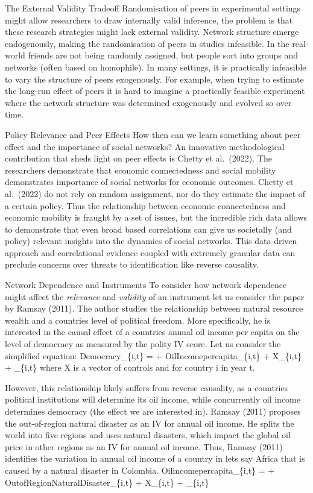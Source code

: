 \documentclass[
  a4paper,
]{article}
\begin{document}
The External Validity Tradeoff Randomisation of peers in experimental
settings might allow researchers to draw internally valid inference, the
problem is that these research strategies might lack external validity.
Network structure emerge endogenously, making the randomisation of peers
in studies infeasible. In the real-world friends are not being randomly
assigned, but people sort into groups and networks (often based on
homophile). In many settings, it is practically infeasible to vary the
structure of peers exogenously. For example, when trying to estimate the
long-run effect of peers it is hard to imagine a practically feasible
experiment where the network structure was determined exogenously and
evolved so over time.

Policy Relevance and Peer Effects How then can we learn something about
peer effect and the importance of social networks? An innovative
methodological contribution that sheds light on peer effects is Chetty
et al.~(2022). The researchers demonstrate that economic connectedness
and social mobility demonstrates importance of social networks for
economic outcomes. Chetty et al.~(2022) do not rely on random
assignment, nor do they estimate the impact of a certain policy. Thus
the relationship between economic connectedness and economic mobility is
fraught by a set of issues, but the incredible rich data allows to
demonstrate that even broad based correlations can give us societally
(and policy) relevant insights into the dynamics of social networks.
This data-driven approach and correlational evidence coupled with
extremely granular data can preclude concerns over threats to
identification like reverse causality.

Network Dependence and Instruments To consider how network dependence
might affect the \textit{relevance} and \textit{validity} of an
instrument let us consider the paper by Ramsay (2011). The author
studies the relationship between natural resource wealth and a countries
level of political freedom. More specifically, he is interested in the
causal effect of a countries annual oil income per capita on the level
of democracy as measured by the polity IV score. Let us consider the
simplified equation: Democracy\_\{i,t\} = \mu +
OilIncomepercapita\_\{i,t\} + \delta X\_\{i,t\} + \varepsilon\_\{i,t\}
where X is a vector of controls and for country i in year t.

However, this relationship likely suffers from reverse causality, as a
countries political institutions will determine its oil income, while
concurrently oil income determines democracy (the effect we are
interested in). Ramsay (2011) proposes the out-of-region natural
disaster as an IV for annual oil income. He splits the world into five
regions and uses natural disasters, which impact the global oil price in
other regions as an IV for annual oil income. Thus, Ramsay (2011)
identifies the variation in annual oil income of a country in lets say
Africa that is caused by a natural disaster in Colombia.
Oilincomepercapita\_\{i,t\} = \mu +
\theta OutofRegionNaturalDisaster\_\{i,t\} + \delta X\_\{i,t\} +
\varepsilon\_\{i,t\}
\end{document}
